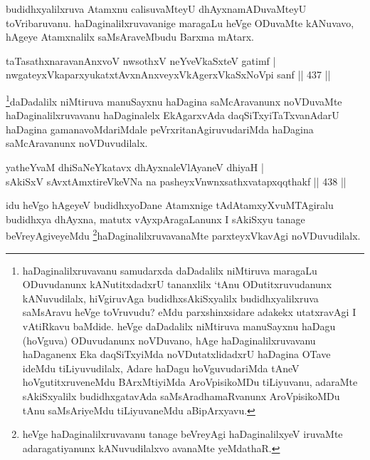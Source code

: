\begin{artha}
budidhxyalilxruva Atamxnu calisuvaMteyU dhAyxnamADuvaMteyU toVribaruvanu. haDaginalilxruvavanige maragaLu heVge ODuvaMte kANuvavo, hAgeye Atamxnalilx saMsAraveMbudu Barxma mAtarx.
\end{artha}

\begin{shl}
taTasathxnaravanAnxvoV nwsothxV neYveVkaSxteV gatimf | \\
nwgateyxVkaparxyukatxtAvxnAnxveyxVkAgerxVkaSxNoV\s pi sanf \hfill||  437 ||  
\end{shl}

\begin{artha}
\footnote{haDaginalilxruvavanu samudarxda daDadalilx niMtiruva maragaLu ODuvudanunx kANutitxdadxrU tananxlilx `tAnu ODutitxruvudanunx kANuvudilalx, hiVgiruvAga budidhxsAkiSxyalilx budidhxyalilxruva saMsAravu heVge toVruvudu? eMdu parxshinxsidare adakekx utatxravAgi I vAtiRkavu baMdide. heVge daDadalilx niMtiruva manuSayxnu haDagu (hoVguva) ODuvudanunx noVDuvano, hAge haDaginalilxruvavanu haDaganenx Eka daqSiTxyiMda noVDutatxlidadxrU haDagina OTave ideMdu tiLiyuvudilalx, Adare haDagu hoVguvudariMda tAneV hoVgutitxruveneMdu BArxMtiyiMda AroVpisikoMDu tiLiyuvanu, adaraMte sAkiSxyalilx budidhxgatavAda saMsAradhamaRvanunx AroVpisikoMDu tAnu saMsAriyeMdu tiLiyuvaneMdu aBipArxyavu.}daDadalilx niMtiruva manuSayxnu haDagina saMcAravanunx noVDuvaMte haDaginalilxruvavanu haDaginalelx EkAgarxvAda daqSiTxyiTaTxvanAdarU haDagina gamanavoMdariMdale peVrxritanAgiruvudariMda haDagina saMcAravanunx noVDuvudilalx.
\end{artha}

\begin{shl}
yatheYvaM dhiSaNeYkatavx dhAyxnaleVlAyaneV dhiyaH | \\
sAkiSxV sAvxtAmxtireVkeVNa na pasheyxVnwnxsathxvatapxqqthakf \hfill||  438 ||  
\end{shl}

\begin{artha}
idu heVgo hAgeyeV budidhxyoDane Atamxnige tAdAtamxyXvuMTAgiralu budidhxya dhAyxna, matutx vAyxpAragaLanunx I sAkiSxyu tanage beVreyAgiveyeMdu \footnote{heVge haDaginalilxruvavanu tanage beVreyAgi haDaginalilxyeV iruvaMte adaragatiyanunx kANuvudilalxvo avanaMte yeMdathaR.}haDaginalilxruvavanaMte parxteyxVkavAgi noVDuvudilalx.
\end{artha}


